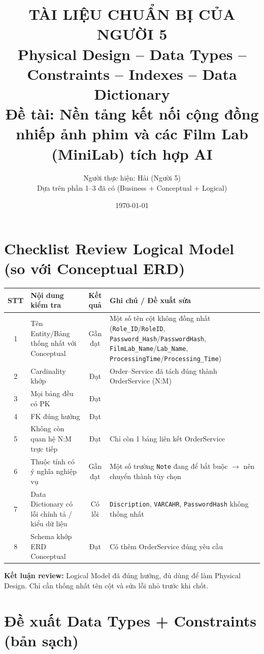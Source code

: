 \documentclass[12pt,a4paper]{article}
\title{\textbf{TÀI LIỆU CHUẨN BỊ CỦA NGƯỜI 5}\\[0.3em]
\large Physical Design -- Data Types -- Constraints -- Indexes -- Data Dictionary\\[0.5em]
\normalsize Đề tài: Nền tảng kết nối cộng đồng nhiếp ảnh phim và các Film Lab (MiniLab) tích hợp AI}
\author{Người thực hiện: Hải (Người 5)\\Dựa trên phần 1--3 đã có (Business + Conceptual + Logical)}
\date{\today}
\begin{document}
\maketitle
\tableofcontents
\newpage

\section{Checklist Review Logical Model (so với Conceptual ERD)}

\begin{table}[ht]
\centering
\begin{tabular}{|c|p{5.5cm}|c|p{6cm}|}
\hline
\textbf{STT} & \textbf{Nội dung kiểm tra} & \textbf{Kết quả} & \textbf{Ghi chú / Đề xuất sửa} \\
\hline
1 & Tên Entity/Bảng thống nhất với Conceptual & Gần đạt & Một số tên cột không đồng nhất (\texttt{Role\_ID}/\texttt{RoleID}, \texttt{Password\_Hash}/\texttt{PasswordHash}, \texttt{FilmLab\_Name}/\texttt{Lab\_Name}, \texttt{ProcessingTime}/\texttt{Processing\_Time}) \\
\hline
2 & Cardinality khớp & Đạt & Order--Service đã tách đúng thành OrderService (N:M) \\
\hline
3 & Mọi bảng đều có PK & Đạt & \\
\hline
4 & FK đúng hướng & Đạt & \\
\hline
5 & Không còn quan hệ N:M trực tiếp & Đạt & Chỉ còn 1 bảng liên kết OrderService \\
\hline
6 & Thuộc tính có ý nghĩa nghiệp vụ & Gần đạt & Một số trường \texttt{Note} đang để bắt buộc $\to$ nên chuyển thành tùy chọn \\
\hline
7 & Data Dictionary có lỗi chính tả / kiểu dữ liệu & Có lỗi & \texttt{Discription}, \texttt{VARCAHR}, \texttt{PasswordHash} không thống nhất \\
\hline
8 & Schema khớp ERD Conceptual & Đạt & Có thêm OrderService đúng yêu cầu \\
\hline
\end{tabular}
\end{table}

\textbf{Kết luận review:} Logical Model đã đúng hướng, đủ dùng để làm Physical Design. Chỉ cần thống nhất tên cột và sửa lỗi nhỏ trước khi chốt.

\section{Đề xuất Data Types + Constraints (bản sạch)}
\end{document}
